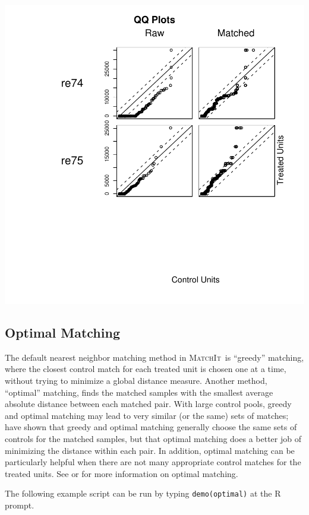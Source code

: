 \documentclass[oneside,letterpaper,titlepage]{article}
\newcommand{\MatchIt}{\textsc{MatchIt}}
\begin{document}
\includegraphics[scale=0.5]{figs/full3}


\subsection{Optimal Matching}
\label{optmatch}

The default nearest neighbor matching method in \MatchIt\ is
``greedy'' matching, where the closest control match for each treated
unit is chosen one at a time, without trying to minimize a global
distance measure.  Another method, ``optimal'' matching, finds the
matched samples with the smallest average absolute distance between
each matched pair.  With large control pools, greedy and optimal
matching may lead to very similar (or the same) sets of matches;
\citet{GuRos93} have shown that greedy and optimal matching generally
choose the same sets of controls for the matched samples, but that
optimal matching does a better job of minimizing the distance within
each pair.  In addition, optimal matching can be particularly helpful
when there are not many appropriate control matches for the treated
units.  See \cite{GuRos93} or \cite{Rosenbaum02} for more information
on optimal matching.

The following example script can be run by typing {\tt demo(optimal)}
at the R prompt.
\end{document}
